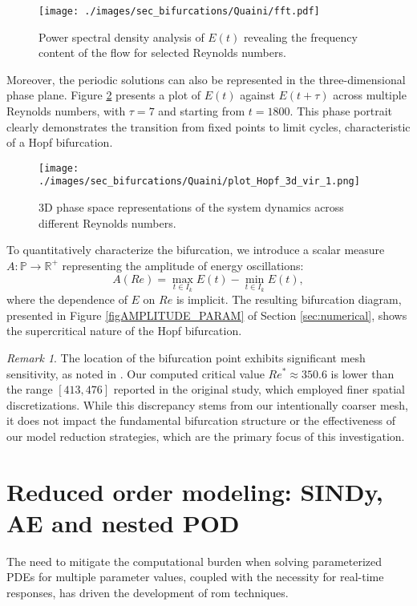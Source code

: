 \documentclass[reqno]{amsart}[standalone]
\theoremstyle{definition}
\theoremstyle{remark}
\newtheorem{remark}[definition]{Remark}
\newcommand{\R}{\mathbb{R}}
\begin{document}
\begin{figure}[ht]
	\centering
    \texttt{[image: ./images/sec\_bifurcations/Quaini/fft.pdf]}
	\caption{Power spectral density analysis of $E(t)$ revealing the frequency content of the flow for selected Reynolds numbers.}
	\label{figFFT_energy}
\end{figure}


%
%

%
Moreover, the periodic solutions can also be represented in the three-dimensional phase plane.
%
Figure \ref{fig:energy} presents %
a plot of $E(t)$ against $E(t+\tau)$ across multiple Reynolds numbers, with $\tau=7$ and starting from $t=1800$.
This phase portrait clearly demonstrates the transition from fixed points to limit cycles, characteristic of a Hopf bifurcation.

\begin{figure}[ht]
    \centering
    \texttt{[image: ./images/sec\_bifurcations/Quaini/plot\_Hopf\_3d\_vir\_1.png]}
    \caption{3D phase space representations of the system dynamics across different Reynolds numbers.}
    \label{fig:energy}
\end{figure}

%
%
%
%
%
%
%
%
%
%
%
%
%
%
%
%
%
%

To quantitatively characterize the bifurcation, we introduce a scalar measure $A: \mathbb{P}\to\R^+$ representing the amplitude of energy oscillations:
\begin{equation}\label{eqAMPLITUDE}
A(Re) = \max_{t\in I_k} E(t) - \min_{t\in I_k} E(t),
\end{equation}
where the dependence of $E$ on $Re$ is implicit.
The resulting bifurcation diagram, presented in Figure \ref{figAMPLITUDE_PARAM} of Section \ref{sec:numerical}, shows the supercritical nature of the Hopf bifurcation.

\begin{remark}\label{rmkBIF_QUAINI}
The location of the bifurcation point exhibits significant mesh sensitivity, as noted in \parencite{QUAINI}. Our computed critical value $Re^\ast\approx 350.6$ is lower than the range $[413, 476]$ reported in the original study, which employed finer spatial discretizations. While this discrepancy stems from our intentionally coarser mesh, it does not impact the fundamental bifurcation structure or the effectiveness of our model reduction strategies, which are the primary focus of this investigation.
\end{remark}
\section{Reduced order modeling: SINDy, AE and nested POD}\label{sec:ROM}
%
The need to mitigate the computational burden when solving parameterized PDEs for multiple parameter values, coupled with the necessity for real-time responses, has driven the development of \gls{rom} techniques.
\end{document}
